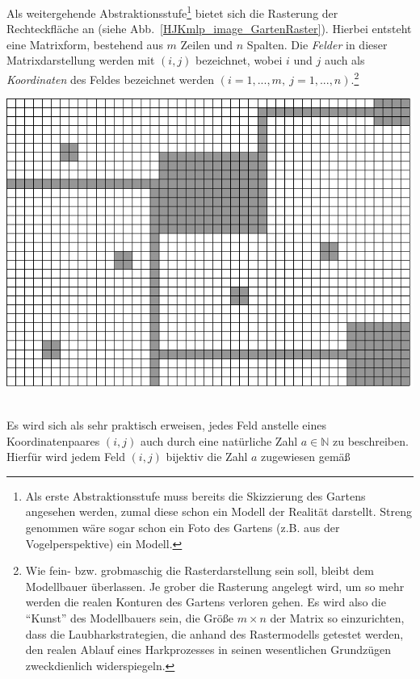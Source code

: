 \documentclass[fontsize=12pt,doubleside,openany,listof=totoc,listof=flat,listof=nochaptergap,numbers=noenddot]{scrbook}
\theoremstyle{style}
\begin{document}
 \noindent Als weitergehende Abstraktionsstufe\footnote{Als erste Abstraktionsstufe muss
 bereits die Skizzierung des Gartens angesehen werden, zumal diese schon ein
 Modell der Realität darstellt. Streng genommen wäre sogar schon ein Foto des 
 Gartens (z.B. aus der Vogelperspektive) ein Modell.} bietet sich die Rasterung 
 der Rechteckfläche an (siehe Abb.~\ref{HJKmlp_image_GartenRaster}).
 Hierbei entsteht eine Matrixform, bestehend aus $m$ Zeilen und $n$ Spalten. Die
 \textit{Felder}\label{Felder} in dieser Matrixdarstellung werden mit $(i,j)$ bezeichnet, wobei 
 $i$ und $j$ auch als \textit{Koordinaten} des Feldes bezeichnet werden 
 $(i=1,...,m,\ j=1,...,n)$.\footnote{Wie fein- bzw. grobmaschig die Rasterdarstellung sein soll, bleibt dem Modellbauer überlassen. Je grober die Rasterung angelegt wird, um so mehr 
werden die realen Konturen des Gartens verloren gehen. Es wird also die
"`Kunst"' des Modellbauers sein, die Größe $m\times n$ der Matrix so einzurichten, dass
die Laubharkstrategien, die anhand des Rastermodells getestet werden, den realen 
Ablauf eines Harkprozesses in seinen wesentlichen Grundzügen zweckdienlich 
widerspiegeln.}

\begin{center}
\begin{minipage}{\textwidth}
\centerline{\includegraphics[angle=0,scale=0.7]{Figures/Laub/GartenRaster.jpg}}
\label{HJKmlp_image_GartenRaster}
\end{minipage}
\end{center}

\phantom \\
\noindent Es wird sich als sehr praktisch erweisen, jedes Feld anstelle eines Koordinatenpaares 
$(i,j)$ auch durch eine natürliche Zahl $a \in \mathbb{N}$ zu beschreiben. Hierfür wird jedem Feld $(i,j)$ bijektiv die Zahl $a$ zugewiesen gemäß 
\end{document}
